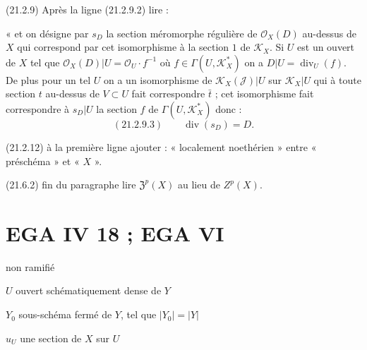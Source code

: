 \documentclass[11pt,a4paper]{article}
\begin{document}
(21.2.9) Après la ligne (21.2.9.2) lire :

« et on désigne par $s_D$ la section méromorphe régulière de
$\mathcal{O}_X(D)$ au-dessus de $X$ qui correspond par cet isomorphisme à la
section $1$ de $\mathcal{K}_X$. Si $U$ est un ouvert de $X$ tel que
$\mathcal{O}_X(D)|U = \mathcal{O}_U \cdot f^{-1}$ où
$f \in \Gamma(U, \mathcal{K}_X^*)$  on a $D|U = \operatorname{div}_U(f)$.
De plus pour un tel $U$ on a un isomorphisme de $\mathcal{K}_X(\mathcal{J})|U$
sur $\mathcal{K}_X|U$ qui à toute section $t$ au-dessus de $V \subset U$ fait
correspondre $\bar{t}$ ; cet isomorphisme fait correspondre à $s_D|U$ la
section $f$ de $\Gamma(U, \mathcal{K}_X^*)$ donc :
\[
  (21.2.9.3) \qquad \operatorname{div}(s_D) = D .
\]


(21.2.12) à la première ligne ajouter   :
« localement noethérien » entre « préschéma » et « $X$ ».


(21.6.2) fin du paragraphe lire $\mathfrak{Z}^p(X)$ au lieu de $Z^p(X)$.

\section{EGA IV 18 ; EGA VI}



non ramifié

$U$ \struck{\ill{}} ouvert schématiquement dense de $Y$

$Y_0$ sous-schéma fermé de $Y$, tel que $|Y_0| = |Y|$

$u_U$ une \struck{\ill{}} section de $X$ sur $U$
\end{document}
